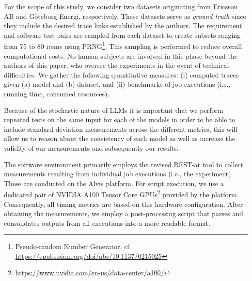 \documentclass[conference]{IEEEtran}
\begin{document}
%
%
%
%
% 

For the scope of this study, we consider two datasets originating from Ericsson
AB and G\"oteborg Energi, respectively. These datasets serve as \textit{ground
truth} since they include the desired trace links established by the authors.
The requirement and software test pairs are sampled from each dataset to create
subsets ranging from 75 to 80 items using PRNG\footnote{Pseudo-random Number
Generator, cf. \url{https://epubs.siam.org/doi/abs/10.1137/0215025}}. This
sampling is performed to reduce overall computational costs. No human subjects
are involved in this phase beyond the authors of this paper, who oversee the
experiments in the event of technical difficulties. We gather the following
quantitative measures: (i) computed traces given (a) model and (b) dataset, and
(ii) benchmarks of job executions (i.e., running time, consumed resources).

Because of the stochastic nature of LLMs it is important that we perform
repeated tests on the same input for each of the models in order to be able to
include standard deviation measurements across the different metrics, this will
allow us to reason about the consistency of each model as well as increase the
validity of our measurements and subsequently our results.

The software environment primarily employs the revised REST-at tool to collect
measurements resulting from individual job executions (i.e., the experiment).
These are conducted on the Alvis platform. For script execution, we use a
dedicated pair of NVIDIA A100 Tensor Core
GPUs\footnote{\url{https://www.nvidia.com/en-us/data-center/a100/}} provided by the
platform. Consequently, all timing metrics are based on this hardware
configuration. After obtaining the measurements, we employ a post-processing
script that parses and consolidates outputs from all executions into a more
readable format.
\end{document}
